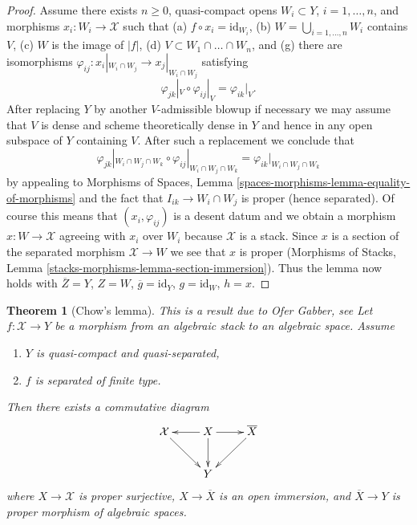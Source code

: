 \documentclass{stacks-project}
\newenvironment{reference}{\comment}{\endcomment}
\theoremstyle{plain}
\newtheorem{theorem}[subsection]{Theorem}
\theoremstyle{definition}
\theoremstyle{remark}
\numberwithin{equation}{subsection}
\begin{document}
\begin{proof}
\medskip\noindent
Assume there exists $n \geq 0$, quasi-compact opens
$W_i \subset Y$, $i = 1, \ldots, n$, and
morphisms $x_i : W_i \to \mathcal{X}$ such that
(a) $f \circ x_i = \text{id}_{W_i}$,
(b) $W = \bigcup_{i = 1, \ldots, n} W_i$ contains $V$,
(c) $W$ is the image of $|f|$,
(d) $V \subset W_1 \cap \ldots \cap W_n$, and
(g) there are isomorphisms
$\varphi_{ij} : x_i|_{W_i \cap W_j} \to x_j|_{W_i \cap W_j}$
satisfying
$$
\varphi_{jk}|_V \circ \varphi_{ij}|_V = \varphi_{ik}|_V.
$$
After replacing $Y$ by another $V$-admissible blowup if necessary
we may assume that $V$ is dense and scheme theoretically dense
in $Y$ and hence in any open subspace of $Y$ containing $V$.
After such a replacement we conclude that
$$
\varphi_{jk}|_{W_i \cap W_j \cap W_k} \circ
\varphi_{ij}|_{W_i \cap W_j \cap W_k} =
\varphi_{ik}|_{W_i \cap W_j \cap W_k}
$$
by appealing to Morphisms of Spaces, Lemma
\ref{spaces-morphisms-lemma-equality-of-morphisms}
and the fact that $I_{ik} \to W_i \cap W_j$ is proper
(hence separated).
Of course this means that $(x_i, \varphi_{ij})$
is a desent datum and we obtain a morphism
$x : W \to \mathcal{X}$ agreeing with $x_i$ over $W_i$
because $\mathcal{X}$ is a stack.
Since $x$ is a section of the separated morphism
$\mathcal{X} \to W$ we see that $x$ is proper
(Morphisms of Stacks, Lemma \ref{stacks-morphisms-lemma-section-immersion}).
Thus the lemma now holds with $\overline{Z} = Y$,
$Z = W$, $\overline{g} = \text{id}_Y$, $g = \text{id}_W$,
$h = x$.
\end{proof}

\begin{theorem}[Chow's lemma]
\label{theorem-chow-finite-type}
\begin{reference}
This is a result due to Ofer Gabber, see
\cite[Theorem 1.1]{olsson_proper}
\end{reference}
Let $f : \mathcal{X} \to Y$ be a morphism from an algebraic stack
to an algebraic space. Assume
\begin{enumerate}
\item $Y$ is quasi-compact and quasi-separated,
\item $f$ is separated of finite type.
\end{enumerate}
Then there exists a commutative diagram
$$
\xymatrix{
\mathcal{X} \ar[rd] & X \ar[l] \ar[d] \ar[r] & \overline{X} \ar[ld] \\
& Y
}
$$
where $X \to \mathcal{X}$ is proper surjective,
$X \to \overline{X}$ is an open immersion, and
$\overline{X} \to Y$ is proper morphism of algebraic spaces.
\end{theorem}
\end{document}
